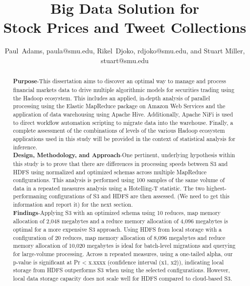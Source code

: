 \documentclass[journal]{IEEEtran}
\begin{document}
\title{Big Data Solution for\\ Stock Prices and Tweet Collections}

\author{Paul~Adams, paula@smu.edu,
        Rikel~Djoko, rdjoko@smu.edu,
        and Stuart Miller, stuart@smu.edu}%


\maketitle

\begin{abstract}
\textbf{Purpose}-This dissertation aims to discover an optimal way to manage and process financial markets data to drive multiple algorithmic models for securities trading using the Hadoop ecosystem. This includes an applied, in-depth analysis of parallel processing using the Elastic MapReduce package on Amazon Web Services and the application of data warehousing using Apache Hive. Additionally, Apache NiFi is used to direct workflow automation scripting to migrate data into the warehouse. Finally, a complete assessment of the combinations of levels of the various Hadoop ecosystem applications used in this study will be provided in the context of statistical analysis for inference.
\\
\textbf{Design, Methodology, and Approach}-One pertinent, underlying hypothesis within this study is to prove that there are differences in processing speeds between S3 and HDFS using normalized and optimized schemas across multiple MapReduce configurations. This analysis is performed using 100 samples of the same volume of data in a repeated measures analysis using a Hotelling-T statistic. The two highest-performaning configurations of S3 and HDFS are then assessed. (We need to get this information and report it) for the next section.
\\
\textbf{Findings}-Applying S3 with an optimized schema using 10 reduces, map memory allocation of 2,048 megabytes and a reduce memory allocation of 4,096 megabytes is optimal for a more expensive S3 approach. Using HDFS from local storage with a configuration of 20 reduces, map memory allocation of 8,096 megabytes and reduce memory allocation of 10,020 megabytes is ideal for batch-level migrations and querying for large-volume processing. Across n repeated measures, using a one-tailed alpha, our p-value is significant at Pr < x.xxxx (confidence interval (x1, x2)), indicating local storage from HDFS outperforms S3 when using the selected configurations. However, local data storage capacity does not scale well for HDFS compared to cloud-based S3.
\end{abstract}
\end{document}
